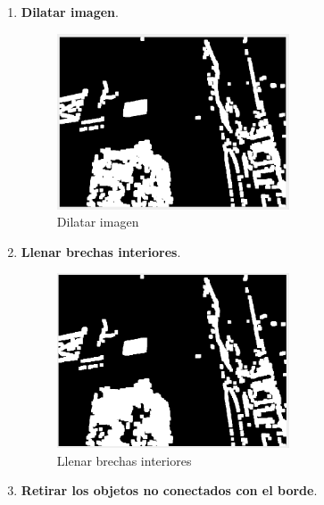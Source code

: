 \documentclass[12pt]{article}
\begin{document}
\begin{enumerate}
		\pagebreak
		
		\item \textbf{Dilatar imagen}.
		
		\begin{figure}[h!]
			\begin{center}
				\includegraphics[width=0.65\textwidth]{img/impl_10.png}
				\caption{Dilatar imagen}
				\label{img: dilatar 2}
			\end{center}
		\end{figure}
		
		\item \textbf{Llenar brechas interiores}.
		
		\begin{figure}[h!]
			\begin{center}
				\includegraphics[width=0.65\textwidth]{img/impl_11.png}
				\caption{Llenar brechas interiores}
				\label{img: brechas 2}
			\end{center}
		\end{figure}
	
		\pagebreak
		
		\item \textbf{Retirar los objetos no conectados con el borde}.
		

\end{enumerate}
\end{document}
